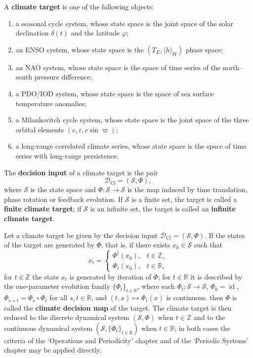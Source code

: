 \begin{definition}\label{def:climate_target}
A \textbf{climate target} is one of the following objects:
\begin{enumerate}[label=(\roman*)]
    \item a seasonal cycle system, whose state space is the joint space of the solar declination $\delta(t)$ and the latitude $\varphi$;
    \item an ENSO system, whose state space is the $(T_E,\langle h\rangle_W)$ phase space;
    \item an NAO system, whose state space is the space of time series of the north--south pressure difference;
    \item a PDO/IOD system, whose state space is the space of sea surface temperature anomalies;
    \item a Milankovitch cycle system, whose state space is the joint space of the three orbital elements $(e,\varepsilon,e\sin\varpi)$;
    \item a long-range correlated climate series, whose state space is the space of time series with long-range persistence.
\end{enumerate}
The \textbf{decision input} of a climate target is the pair
\[
\mathcal D_{\mathrm{Cl}}=(\mathcal S,\Phi),
\]
where $\mathcal S$ is the state space and $\Phi:\mathcal S\to\mathcal S$ is the map induced by time translation, phase rotation or feedback evolution. If $\mathcal S$ is a finite set, the target is called a \textbf{finite climate target}; if $\mathcal S$ is an infinite set, the target is called an \textbf{infinite climate target}.
\end{definition}

\begin{definition}\label{def:climate_periodization}
Let a climate target be given by the decision input $\mathcal D_{\mathrm{Cl}}=(\mathcal S,\Phi)$. If the states of the target are generated by $\Phi$, that is, if there exists $x_0\in\mathcal S$ such that
\[
x_t=\begin{cases}\Phi^t(x_0), & t\in\mathbb Z,\\ \Phi_t(x_0), & t\in\mathbb R,\end{cases}
\]
for $t\in\mathbb Z$ the state $x_t$ is generated by iteration of $\Phi$; for $t\in\mathbb R$ it is described by the one-parameter evolution family $\{\Phi_t\}_{t\in\mathbb R}$, where each $\Phi_t:\mathcal S\to\mathcal S$, $\Phi_0=\operatorname{id}$, $\Phi_{s+t}=\Phi_s\circ\Phi_t$ for all $s,t\in\mathbb R$, and $(t,x)\mapsto\Phi_t(x)$ is continuous.
then $\Phi$ is called the \textbf{climate decision map} of the target. The climate target is then reduced to the discrete dynamical system $(\mathcal S,\Phi)$ when $t\in\mathbb Z$ and to the continuous dynamical system $(\mathcal S,\{\Phi_t\}_{t\in\mathbb R})$ when $t\in\mathbb R$; in both cases the criteria of the `Operations and Periodicity' chapter and of the `Periodic Systems' chapter may be applied directly.
\end{definition}

